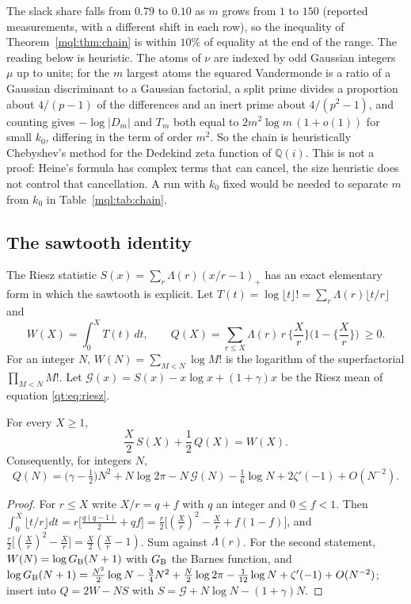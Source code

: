 The slack share falls from $0.79$ to $0.10$ as $m$ grows from $1$ to $150$ (reported measurements, with a different shift in each row), so the inequality of Theorem~\ref{mql:thm:chain} is within $10\%$ of equality at the end of the range. The reading below is heuristic. The atoms of $\nu$ are indexed by odd Gaussian integers $\mu$ up to units; for the $m$ largest atoms the squared Vandermonde is a ratio of a Gaussian discriminant to a Gaussian factorial, a split prime divides a proportion about $4/(p-1)$ of the differences and an inert prime about $4/(p^2-1)$, and counting gives $-\log|D_m|$ and $T_m$ both equal to $2m^2\log m\,(1+o(1))$ for small $k_0$, differing in the term of order $m^2$. So the chain is heuristically Chebyshev's method for the Dedekind zeta function of $\mathbb Q(i)$. This is not a proof: Heine's formula has complex terms that can cancel, the size heuristic does not control that cancellation. A run with $k_0$ fixed would be needed to separate $m$ from $k_0$ in Table~\ref{mql:tab:chain}.

\subsection{The sawtooth identity}\label{mql:sub:sawtooth}

The Riesz statistic $S(x)=\sum_r\Lambda(r)(x/r-1)_+$ has an exact elementary form in which the sawtooth is explicit. Let $T(t)=\log\lfloor t\rfloor!=\sum_r\Lambda(r)\lfloor t/r\rfloor$ and
\[
W(X)=\int_0^XT(t)\,dt,\qquad Q(X)=\sum_{r\le X}\Lambda(r)\,r\,\Big\{\frac Xr\Big\}\Big(1-\Big\{\frac Xr\Big\}\Big)\ \ge0 .
\]
For an integer $N$, $W(N)=\sum_{M<N}\log M!$ is the logarithm of the superfactorial $\prod_{M<N}M!$. Let $\mathcal G(x)=S(x)-x\log x+(1+\gamma)x$ be the Riesz mean of equation \eqref{qt:eq:riesz}.

\begin{theorem}\label{mql:thm:sawtooth}
For every $X\ge1$,
\[
\frac X2\,S(X)+\frac12\,Q(X)=W(X).
\]
Consequently, for integers $N$,
\[
Q(N)=\big(\gamma-\tfrac12\big)N^2+N\log2\pi-N\,\mathcal G(N)-\tfrac16\log N+2\zeta'(-1)+O(N^{-2}).
\]
\end{theorem}

\begin{proof}
For $r\le X$ write $X/r=q+f$ with $q$ an integer and $0\le f<1$. Then $\int_0^X\lfloor t/r\rfloor dt=r\big[\frac{q(q-1)}2+qf\big]=\frac r2\big[(\frac Xr)^2-\frac Xr+f(1-f)\big]$, and $\frac r2\big[(\frac Xr)^2-\frac Xr\big]=\frac X2(\frac Xr-1)$. Sum against $\Lambda(r)$. For the second statement, $W(N)=\log G_{\rm B}(N+1)$ with $G_{\rm B}$ the Barnes function, and $\log G_{\rm B}(N+1)=\frac{N^2}2\log N-\frac34N^2+\frac N2\log2\pi-\frac1{12}\log N+\zeta'(-1)+O(N^{-2})$; insert into $Q=2W-NS$ with $S=\mathcal G+N\log N-(1+\gamma)N$.
\end{proof}

